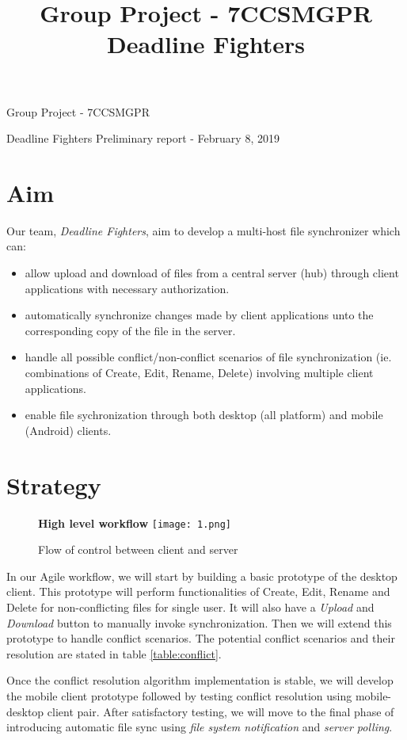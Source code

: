 \documentclass[a4paper]{article}
\title{Group Project - 7CCSMGPR \hspace{0.5 cm}Deadline Fighters}
\begin{document}
{
\begin{center}
		\LARGE{Group Project - 7CCSMGPR}
\end{center}
\begin{center}
		\hspace{0.5cm} Deadline Fighters \hspace{0.5 cm} Preliminary report - February 8, 2019
\end{center}


\section{Aim}
Our team, \emph{Deadline Fighters}, aim to develop a multi-host file synchronizer which can:
\begin{itemize}
\item{allow upload and download of files from a central server (hub) through client applications with necessary authorization.}
\item{automatically synchronize changes made by client applications unto the corresponding copy of the file in the server.}
\item{handle all possible conflict/non-conflict scenarios of file synchronization (ie. combinations of Create, Edit, Rename, Delete) involving multiple client applications.}
\item{enable file sychronization through both desktop (all platform) and mobile (Android) clients.}
\end{itemize}

\section{Strategy}
\begin{figure}[H]
	\centering
	\textbf{High level workflow}
	\texttt{[image: 1.png]}
	\caption{Flow of control between client and server}
\end{figure}\par
In our Agile workflow, we will start by building a basic prototype of the desktop client. This prototype will perform functionalities of Create, Edit, Rename and Delete for non-conflicting files for single user. It will also have a \emph{Upload} and \emph{Download} button to manually invoke synchronization. Then we will extend this prototype to handle conflict scenarios. The potential conflict scenarios and their resolution are stated in table \ref{table:conflict}.

Once the conflict resolution algorithm implementation is stable, we will develop the mobile client prototype followed by testing conflict resolution using mobile-desktop client pair. After satisfactory testing, we will move to the final phase of introducing automatic file sync using \emph{file system notification} and \emph{server polling}.

}
\end{document}
